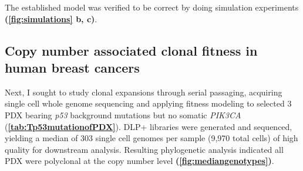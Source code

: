 
The established model was verified to be correct by doing simulation experiments \cite{salehi2020single} \textbf{(\autoref{fig:simulations} b, c)}.




\subsection{Copy number associated clonal fitness in human breast cancers}

Next, I sought to study clonal expansions through serial passaging, acquiring single cell whole genome sequencing and applying fitness modeling to selected 3 PDX bearing \textit{p53} background mutations but no somatic  \textit{PIK3CA} (\textbf{\autoref{tab:Tp53mutationofPDX}}).
%
DLP+ libraries were generated and sequenced, yielding a median of 303 single cell genomes per sample (9,970 total cells) of high quality for downstream analysis. Resulting phylogenetic analysis indicated all PDX were polyclonal at the copy number level \textbf{(\autoref{fig:mediangenotypes})}.

 

